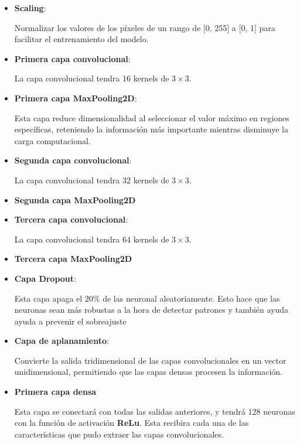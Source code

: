 \documentclass[../main.tex]{subfiles}
\begin{document}
\begin{itemize}
\begin{itemize}
    \item \textbf{Scaling}:

    Normalizar los valores de los píxeles de un rango de [0, 255] a [0, 1] para facilitar el entrenamiento del modelo.

    \item \textbf{Primera capa convolucional}:

    La capa convolucional tendra 16 kernels de \(3 \times 3\).

    \item \textbf{Primera capa MaxPooling2D}:

    Esta capa reduce dimensionalidad al seleccionar el valor máximo en regiones específicas, reteniendo la información más importante mientras disminuye la carga computacional.

    \item \textbf{Segunda capa convolucional}:

    La capa convolucional tendra 32 kernels de \(3 \times 3\).

    \item \textbf{Segunda capa MaxPooling2D}

    \item \textbf{Tercera capa convolucional}:
    
    La capa convolucional tendra 64 kernels de \(3 \times 3\).

    \item \textbf{Tercera capa MaxPooling2D}
    
    \item \textbf{Capa Dropout}:
    
    Esta capa apaga el 20\% de las neuronal aleatoriamente. Esto hace que las neuronas sean más robustas a la hora de detectar patrones y también ayuda ayuda a prevenir el sobreajuste

    \item \textbf{Capa de aplanamiento}:
    
    Convierte la salida tridimensional de las capas convolucionales en un vector unidimensional, permitiendo que las capas densas procesen la información.

    \item \textbf{Primera capa densa}
    
    Esta capa se conectará con todas las salidas anteriores, y tendrá 128 neuronas con la función de activación \textbf{ReLu}. Esta recibira cada una de las características que pudo extraer las capas convolucionales.


\end{itemize}
\end{itemize}
\end{document}

